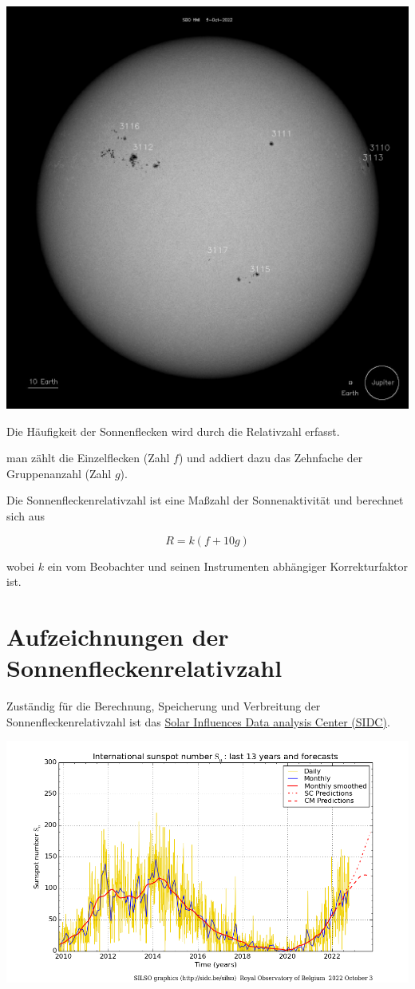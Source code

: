 \documentclass[
  a4paper,
  DIV=11]{scrreprt}
\begin{document}
\includegraphics{./images/paste-612C7829.png}

Die Häufigkeit der Sonnenflecken wird durch die Relativzahl erfasst.

man zählt die Einzelflecken (Zahl \(f\)) und addiert dazu das Zehnfache
der Gruppenanzahl (Zahl \(g\)).

Die Sonnenfleckenrelativzahl ist eine Maßzahl der Sonnenaktivität und
berechnet sich aus

\[
R = k ( f + 10 g)
\]

wobei \(k\) ein vom Beobachter und seinen Instrumenten abhängiger
Korrekturfaktor ist.

\hypertarget{aufzeichnungen-der-sonnenfleckenrelativzahl}{%
\section{Aufzeichnungen der
Sonnenfleckenrelativzahl}\label{aufzeichnungen-der-sonnenfleckenrelativzahl}}

Zuständig für die Berechnung, Speicherung und Verbreitung der
Sonnenfleckenrelativzahl ist das
\href{https://www.sidc.be/silso/home}{Solar Influences Data analysis
Center (SIDC)}.

\includegraphics{./images/paste-F8C5D725.png}
\end{document}
